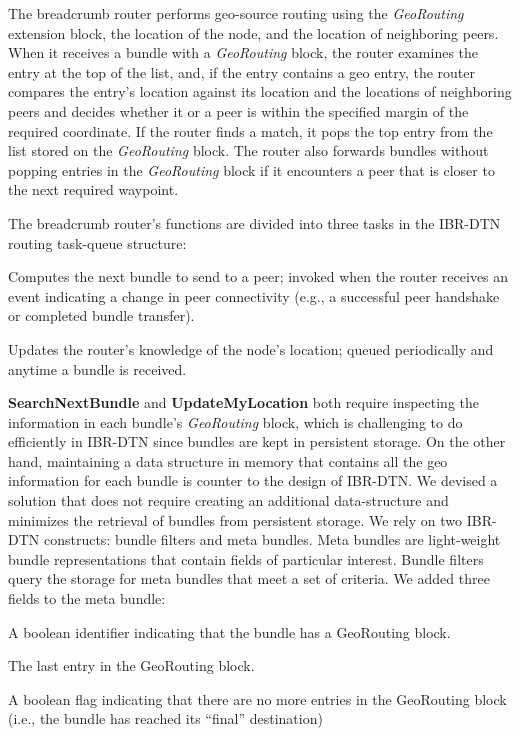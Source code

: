 
The {\sc breadcrumb} router performs geo-source routing using the {\em GeoRouting} extension block, the location of the node, and the location of neighboring peers. When it receives a bundle with a {\em GeoRouting} block, the router examines the entry at the top of the list, and, if the entry contains a geo entry, the router compares the entry's location against its location and the locations of neighboring peers and decides whether it or a peer is within the specified margin of the required coordinate. If the router finds a match, it pops the top entry from the list stored on the {\em GeoRouting} block. The router also forwards bundles without popping entries in the {\em GeoRouting} block if it encounters a peer that is closer to the next required waypoint. %

The {\sc breadcrumb} router's functions are divided into three tasks in the IBR-DTN routing task-queue structure:
\begin{description*}
\item[SearchNextBundle.] Computes the next bundle to send to a peer; invoked when the router receives an event indicating a change in peer connectivity (e.g., a successful peer handshake or completed bundle transfer).
\item[UpdateMyLocation.] Updates the router's knowledge of the node's location; queued periodically and anytime a bundle is received.
\end{description*}

{\bf SearchNextBundle} and {\bf UpdateMyLocation} both require inspecting the information in each bundle's {\em GeoRouting} block, which is challenging to do efficiently in IBR-DTN since bundles are kept in persistent storage. On the other hand, maintaining a data structure in memory that contains all the geo information for each bundle is counter to the design of IBR-DTN. We devised a solution that does not require creating an additional data-structure and minimizes the retrieval of bundles from persistent storage.  We rely on two IBR-DTN constructs: {\sc bundle filters} and {\sc meta bundles}. {\sc Meta bundles} are light-weight bundle representations that contain fields of particular interest. {\sc Bundle filters} query the storage for meta bundles that meet a set of criteria. We added three fields to the {\sc meta bundle}:
\begin{description*}
\item[hasgeoroute.] A boolean identifier indicating that the bundle has a {\sc GeoRouting} block.
\item[nextgeohop.] The last entry in the {\sc GeoRouting} block.
\item[reacheddest.] A boolean flag indicating that there are no more entries in the {\sc GeoRouting} block (i.e., the bundle has reached its ``final'' destination)
\end{description*}

